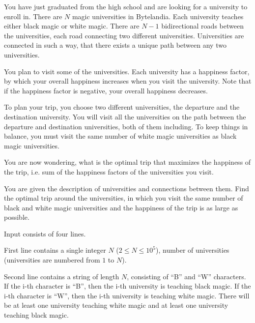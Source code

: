 

You have just graduated from the high school and are looking for a university to enroll in.
There are $N$ magic universities in Bytelandia. Each university teaches either
black magic or white magic. There are $N-1$ bidirectional roads between the universities, each road
connecting two different universities. Universities are connected in such a way,
that there exists a unique path between any two universities.

You plan to visit some of the universities.
Each university has a happiness factor, by which your overall happiness increases
when you visit the university. Note that if the happiness factor is negative, your overall
happiness decreases.

To plan your trip, you choose two different universities,
the departure and the destination university. You will visit all the universities
on the path between the departure and destination universities, both of them including.
To keep things in balance, you must visit the same number of white magic universities as black magic universities.

You are now wondering, what is the optimal trip that maximizes the happiness of the trip,
i.e. sum of the happiness factors of the universities you visit.


You are given the description of universities and connections between them.
Find the optimal trip around the universities, in which you visit
the same number of black and white magic universities and the happiness of the trip
is as large as possible.


Input consists of four lines.

First line contains a single integer $N$ ($2 \leq N \leq 10^5$), number of universities (universities are numbered from $1$ to $N$).

Second line contains a string of length $N$, consisting of ``B'' and ``W'' characters.
If the i-th character is ``B'', then the i-th university is teaching black magic.
If the i-th character is ``W'', then the i-th university is teaching white magic.
There will be at least one university teaching white magic and at least one university teaching black magic.

